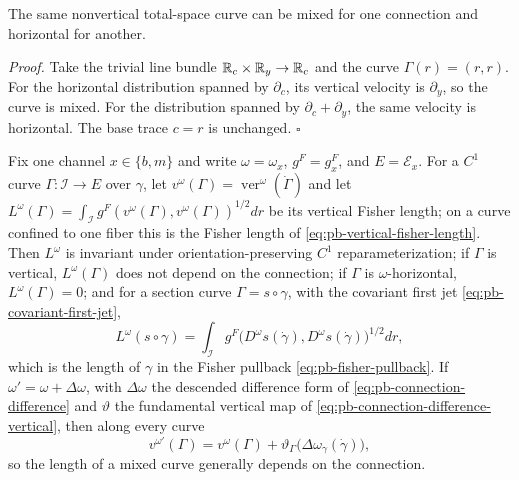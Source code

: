 The same nonvertical total-space curve can be mixed for one connection and
horizontal for another. 

\noindent\emph{Proof.}
Take the trivial line bundle \(\mathbb R_{c}\times\mathbb R_{y}\to\mathbb R_{c}\) and the curve
\(\Gamma(r)=(r,r)\). For the horizontal distribution spanned by
\(\partial_c\), its vertical velocity is \(\partial_y\), so the curve is mixed.
For the distribution spanned by \(\partial_c+\partial_y\), the same velocity is
horizontal. The base trace \(c=r\) is unchanged. \(\square\)

Fix one channel \(x\in\{b,m\}\) and write \(\omega=\omega_x\),
\(g^F=g^F_x\), and \(E=\mathcal E_x\). For a \(C^1\) curve
\(\Gamma:\mathscr I\to E\) over \(\gamma\), let
\(v^\omega(\Gamma)=\operatorname{ver}^\omega(\dot\Gamma)\) and let
\(L^\omega(\Gamma)=\int_{\mathscr I}g^F(v^\omega(\Gamma),v^\omega(\Gamma))^{1/2}dr\)
be its vertical Fisher length; on a curve confined to one fiber this is the
Fisher length of \eqref{eq:pb-vertical-fisher-length}. Then \(L^\omega\) is
invariant under orientation-preserving \(C^1\) reparameterization; if
\(\Gamma\) is vertical, \(L^\omega(\Gamma)\) does not depend on the connection;
if \(\Gamma\) is \(\omega\)-horizontal, \(L^\omega(\Gamma)=0\); and for a section
curve \(\Gamma=s\circ\gamma\), with the covariant first jet
\eqref{eq:pb-covariant-first-jet},
\begin{equation}
L^\omega(s\circ\gamma)
=\int_{\mathscr I}
g^F\bigl(D^\omega s(\dot\gamma),D^\omega s(\dot\gamma)\bigr)^{1/2}dr,
\label{eq:pb-section-curve-length}
\end{equation}
which is the length of \(\gamma\) in the Fisher pullback
\eqref{eq:pb-fisher-pullback}. If \(\omega'=\omega+\Delta\omega\), with
\(\Delta\omega\) the descended difference form of
\eqref{eq:pb-connection-difference} and \(\vartheta\) the fundamental vertical
map of \eqref{eq:pb-connection-difference-vertical}, then along every curve
\begin{equation}
v^{\omega'}(\Gamma)
=v^\omega(\Gamma)
+\vartheta_{\Gamma}\bigl(\Delta\omega_{\gamma}(\dot\gamma)\bigr),
\label{eq:pb-curve-connection-change}
\end{equation}
so the length of a mixed curve generally depends on the connection.

